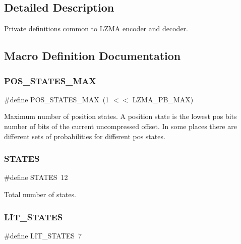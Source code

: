 \subsection{Detailed Description}
Private definitions common to L\+Z\+MA encoder and decoder. 



\subsection{Macro Definition Documentation}
\mbox{\label{lzma__common_8h_a745eda4922193007c4b894dd75330549}} 
\subsubsection{P\+O\+S\+\_\+\+S\+T\+A\+T\+E\+S\+\_\+\+M\+AX}
{\footnotesize\ttfamily \#define P\+O\+S\+\_\+\+S\+T\+A\+T\+E\+S\+\_\+\+M\+AX~(1 $<$$<$ L\+Z\+M\+A\+\_\+\+P\+B\+\_\+\+M\+AX)}

Maximum number of position states. A position state is the lowest pos bits number of bits of the current uncompressed offset. In some places there are different sets of probabilities for different pos states. \mbox{\label{lzma__common_8h_ab09b5cfbb756f1b30c59bf321716fd2e}} 
\subsubsection{S\+T\+A\+T\+ES}
{\footnotesize\ttfamily \#define S\+T\+A\+T\+ES~12}



Total number of states. 

\mbox{\label{lzma__common_8h_ae303e2388293410797ababce2713a272}} 
\subsubsection{L\+I\+T\+\_\+\+S\+T\+A\+T\+ES}
{\footnotesize\ttfamily \#define L\+I\+T\+\_\+\+S\+T\+A\+T\+ES~7}



